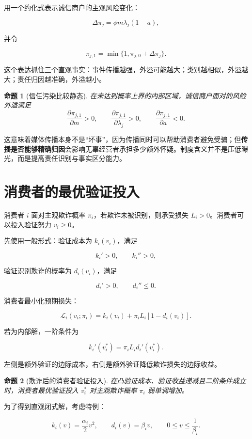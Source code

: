 \documentclass[UTF8,12pt]{ctexart}
\newtheorem{proposition}{命题}
\begin{document}
用一个约化式表示诚信商户的主观风险变化：

\[
\Delta \pi_j
= \phi m\lambda_j(1-a),
\]

并令

\[
\pi_{j,1}=\min\{1,\pi_{j,0}+\Delta\pi_j\}.
\]

这个表达抓住三个直观事实：事件传播越强，外溢可能越大；类别越相似，外溢越大；责任归因越准确，外溢越小。

\begin{proposition}[信任污染比较静态]
在未达到概率上界的内部区域，诚信商户面对的风险外溢满足
\[
\frac{\partial \pi_{j,1}}{\partial m}>0,\qquad
\frac{\partial \pi_{j,1}}{\partial \lambda_j}>0,\qquad
\frac{\partial \pi_{j,1}}{\partial a}<0.
\]
\end{proposition}

这意味着媒体传播本身不是“坏事”，因为传播同时可以帮助消费者避免受骗；但\textbf{传播是否能够精确归因}会影响无辜经营者承担多少额外怀疑。制度含义并不是压低曝光，而是提高责任识别与事实区分能力。

\section{消费者的最优验证投入}

消费者 $i$ 面对主观欺诈概率 $\pi_i$，若欺诈未被识别，则承受损失 $L_i>0$。消费者可以投入验证努力 $v_i\geq0$。

先使用一般形式：验证成本为 $k_i(v_i)$，满足

\[
k_i'>0,\qquad k_i''>0,
\]

验证识别欺诈的概率为 $d_i(v_i)$，满足

\[
d_i'>0,\qquad d_i''\leq0.
\]

消费者最小化预期损失：

\[
\mathcal{L}_i(v_i;\pi_i)
= k_i(v_i)+\pi_iL_i[1-d_i(v_i)].
\]

若为内部解，一阶条件为

\[
k_i'(v_i^*)=\pi_iL_i d_i'(v_i^*).
\]

左侧是额外验证的边际成本，右侧是额外验证降低欺诈损失的边际收益。

\begin{proposition}[欺诈后的消费者验证投入]
在凸验证成本、验证收益递减且二阶条件成立时，消费者最优验证投入 $v_i^*$ 对主观欺诈概率 $\pi_i$ 弱单调增加。
\end{proposition}

为了得到直观闭式解，考虑特例：

\[
k_i(v)=\frac{\alpha_i}{2}v^2,
\qquad
d_i(v)=\beta_i v,
\qquad 0\leq v\leq \frac{1}{\beta_i}.
\]
\end{document}
